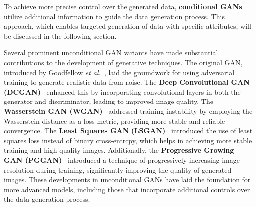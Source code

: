 \documentclass[12pt,DIV14,BCOR12mm,a4paper,footinclude=false,headinclude,parskip=half-,twoside,openright,cleardoublepage=empty,toc=index,bibliography=totoc,listof=totoc]{scrreprt}
\numberwithin{equation}{chapter}
\begin{document}
To achieve more precise control over the generated data, \textbf{conditional GANs}~\cite{devries2019evaluation, mirza2014conditional} utilize additional information to guide the data generation process. This approach, which enables targeted generation of data with specific attributes, will be discussed in the following section.

Several prominent unconditional GAN variants have made substantial contributions to the development of generative techniques. The original GAN, introduced by Goodfellow \textit{et al.}~\cite{goodfellow2014generative}, laid the groundwork for using adversarial training to generate realistic data from noise. The \textbf{Deep Convolutional GAN (DCGAN)}~\cite{radford2015unsupervised} enhanced this by incorporating convolutional layers in both the generator and discriminator, leading to improved image quality. The \textbf{Wasserstein GAN (WGAN)}~\cite{arjovsky2017wasserstein} addressed training instability by employing the Wasserstein distance as a loss metric, providing more stable and reliable convergence. The \textbf{Least Squares GAN (LSGAN)}~\cite{mao2017least} introduced the use of least squares loss instead of binary cross-entropy, which helps in achieving more stable training and high-quality images. Additionally, the \textbf{Progressive Growing GAN (PGGAN)}~\cite{karras2017progressive} introduced a technique of progressively increasing image resolution during training, significantly improving the quality of generated images. These developments in unconditional GANs have laid the foundation for more advanced models, including those that incorporate additional controls over the data generation process.
\end{document}
